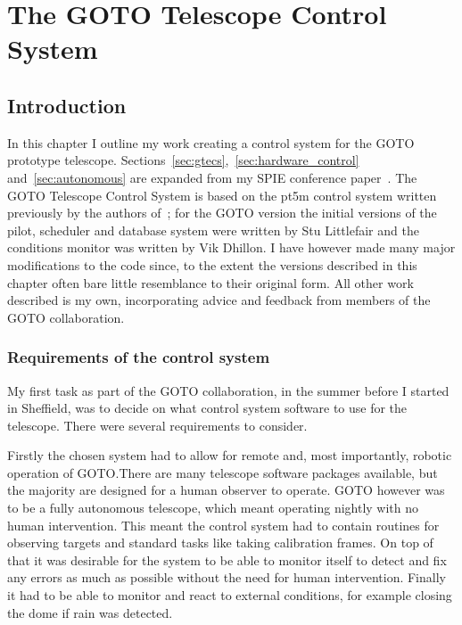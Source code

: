 \chapter{The GOTO Telescope Control System}
\label{chap:gtecs}
\chaptoc{}


\newpage
\section{Introduction}
\label{sec:gtecs_intro}
\begin{colsection}


\begin{colsection}

In this chapter I outline my work creating a control system for the GOTO prototype telescope. Sections~\ref{sec:gtecs},~\ref{sec:hardware_control} and~\ref{sec:autonomous} are expanded from my SPIE conference paper~\cite{Dyer}. The GOTO Telescope Control System is based on the pt5m control system written previously by the authors of~\cite{pt5m}; for the GOTO version the initial versions of the pilot, scheduler and database system were written by Stu Littlefair and the conditions monitor was written by Vik Dhillon. I have however made many major modifications to the code since, to the extent the versions described in this chapter often bare little resemblance to their original form. All other work described is my own, incorporating advice and feedback from members of the GOTO collaboration.

\end{colsection}


\subsection{Requirements of the control system}
\label{sec:control_requirements}
\begin{colsection}

My first task as part of the GOTO collaboration, in the summer before I started in Sheffield, was to decide on what control system software to use for the telescope. There were several requirements to consider.

Firstly the chosen system had to allow for remote and, most importantly, robotic operation of GOTO.\@ There are many telescope software packages available, but the majority are designed for a human observer to operate. GOTO however was to be a fully autonomous telescope, which meant operating nightly with no human intervention. This meant the control system had to contain routines for observing targets and standard tasks like taking calibration frames. On top of that it was desirable for the system to be able to monitor itself to detect and fix any errors as much as possible without the need for human intervention. Finally it had to be able to monitor and react to external conditions, for example closing the dome if rain was detected.


\end{colsection}
\end{colsection}
